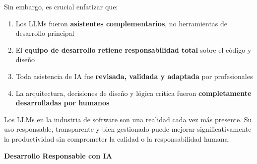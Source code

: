 \documentclass[12pt, a4paper]{article}
\begin{document}
Sin embargo, es crucial enfatizar que:

\begin{enumerate}[leftmargin=2em]
    \item Los LLMs fueron \textbf{asistentes complementarios}, no herramientas de desarrollo principal
    \item El \textbf{equipo de desarrollo retiene responsabilidad total} sobre el código y diseño
    \item Toda asistencia de IA fue \textbf{revisada, validada y adaptada} por profesionales
    \item La arquitectura, decisiones de diseño y lógica crítica fueron \textbf{completamente desarrolladas por humanos}
\end{enumerate}

Los LLMs en la industria de software son una realidad cada vez más presente. Su uso responsable, transparente y bien gestionado puede mejorar significativamente la productividad sin comprometer la calidad o la responsabilidad humana.

\vspace{2em}

\begin{center}
    \textcolor{verdeexito}{\textbf{Desarrollo Responsable con IA}}
\end{center}
\end{document}
